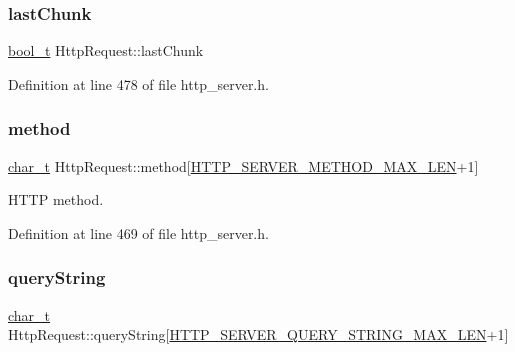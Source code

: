\mbox{\label{structHttpRequest_a71a982c510e85e91e7bfe9bf6d38b694}} 
\subsubsection{\texorpdfstring{last\+Chunk}{lastChunk}}
{\footnotesize\ttfamily \hyperlink{compiler__port_8h_a812d16e5494522586b3784e55d479912}{bool\+\_\+t} Http\+Request\+::last\+Chunk}



Definition at line 478 of file http\+\_\+server.\+h.

\mbox{\label{structHttpRequest_a66c9d190f2a6cbce14cd1eec6ab7f19d}} 
\subsubsection{\texorpdfstring{method}{method}}
{\footnotesize\ttfamily \hyperlink{compiler__port_8h_a40bb5262bf908c328fbcfbe5d29d0201}{char\+\_\+t} Http\+Request\+::method\mbox{[}\hyperlink{http__server_8h_a34523e60668c177e7019c01fcc6feacf}{H\+T\+T\+P\+\_\+\+S\+E\+R\+V\+E\+R\+\_\+\+M\+E\+T\+H\+O\+D\+\_\+\+M\+A\+X\+\_\+\+L\+EN}+1\mbox{]}}



H\+T\+TP method. 



Definition at line 469 of file http\+\_\+server.\+h.

\mbox{\label{structHttpRequest_ab298eaa4afb86533f4559824cb615624}} 
\subsubsection{\texorpdfstring{query\+String}{queryString}}
{\footnotesize\ttfamily \hyperlink{compiler__port_8h_a40bb5262bf908c328fbcfbe5d29d0201}{char\+\_\+t} Http\+Request\+::query\+String\mbox{[}\hyperlink{http__server_8h_af206292720529e388faffbf1955fa0eb}{H\+T\+T\+P\+\_\+\+S\+E\+R\+V\+E\+R\+\_\+\+Q\+U\+E\+R\+Y\+\_\+\+S\+T\+R\+I\+N\+G\+\_\+\+M\+A\+X\+\_\+\+L\+EN}+1\mbox{]}}



